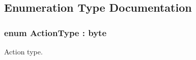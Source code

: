 \subsection{Enumeration Type Documentation}
\hypertarget{namespaceOTA_1_1ID_a1f5264d1d5ca29e0f8e2eb23fc7271ed}{}
\subsubsection[{Action\+Type}]{\setlength{\rightskip}{0pt plus 5cm}enum {\bf Action\+Type} \+: byte\hspace{0.3cm}{\ttfamily [strong]}}\label{namespaceOTA_1_1ID_a1f5264d1d5ca29e0f8e2eb23fc7271ed}


Action type. 

